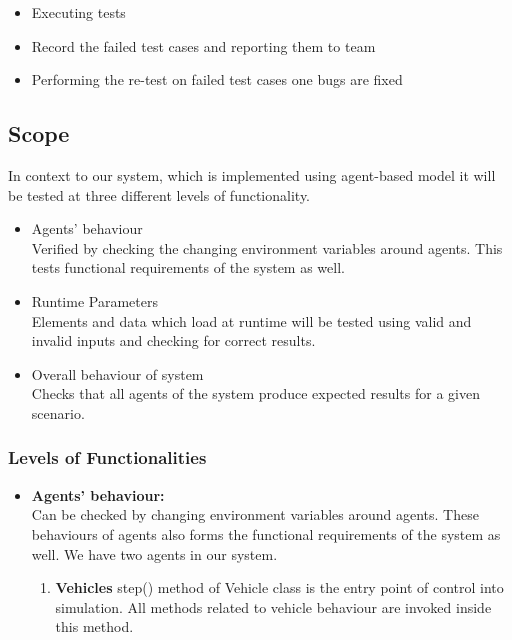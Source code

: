 \documentclass[11pt]{article}
\begin{document}
\begin{enumerate}
\begin{itemize}
\item Executing tests

\item Record the failed test cases and reporting them to team

\item Performing the re-test on failed test cases one bugs are fixed
\end{itemize}

\subsection{Scope}
In context to our system, which is implemented using agent-based model it will be tested at three different levels of functionality.
\begin{itemize}
\item Agents' behaviour\hfill \\
Verified by checking the changing environment variables around agents. This tests functional requirements of the system as well.\hfill \\

\item Runtime Parameters\hfill \\
Elements and data which load at runtime will be tested using valid and invalid inputs and checking for correct results. \hfill \\

\item Overall behaviour of system\hfill \\
Checks that all agents of the system produce expected results for a given scenario.\hfill \\

\end{itemize} 



\subsubsection{Levels of Functionalities}
\begin{itemize}%

\item \textbf{Agents' behaviour: } \hspace \\ %
Can be checked by changing environment variables around agents. These behaviours of agents also forms the functional requirements of the system as well. We have two agents in our system. 

\begin{enumerate}%
\item\textbf {Vehicles}
step() method of Vehicle class is the entry point of control into simulation. All methods related to vehicle behaviour are invoked inside this method.\hfill \\




\end{enumerate}
\end{itemize}
\end{enumerate}
\end{document}
